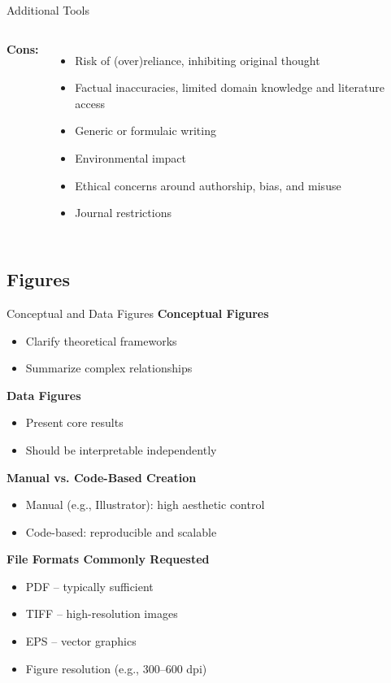 \documentclass{beamer}
\begin{document}
\begin{frame}{Additional Tools}
\begin{columns}[T, totalwidth=\textwidth]
    {\fontsize{8pt}{9pt}\selectfont
    \textbf{Cons:}
    \begin{itemize}
        \item Risk of (over)reliance, inhibiting original thought
        \item Factual inaccuracies, limited domain knowledge and literature access
        \item Generic or formulaic writing
        \item Environmental impact
        \item Ethical concerns around authorship, bias, and misuse
        \item Journal restrictions
    \end{itemize}
    }
\end{columns}

\end{frame}

\subsection{Figures}
\footnotesize

\begin{frame}{Conceptual and Data Figures}
\textbf{Conceptual Figures}
\begin{itemize}
    \item Clarify theoretical frameworks
    \item Summarize complex relationships
\end{itemize}

\textbf{Data Figures}
\begin{itemize}
    \item Present core results
    \item Should be interpretable independently
\end{itemize}

\textbf{Manual vs. Code-Based Creation}
\begin{itemize}
    \item Manual (e.g., Illustrator): high aesthetic control
    \item Code-based: reproducible and scalable
\end{itemize}

\textbf{File Formats Commonly Requested}
\begin{itemize}
    \item PDF – typically sufficient
    \item TIFF – high-resolution images
    \item EPS – vector graphics
    \item Figure resolution (e.g., 300–600 dpi)
\end{itemize}

\end{frame}
\end{document}
